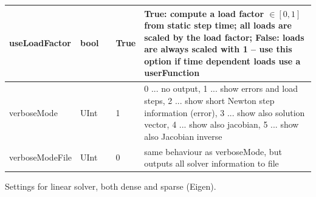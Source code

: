 \begin{center}
\begin{longtable}{| p{4.2cm} | p{2.5cm} | p{0.3cm} | p{3.0cm} | p{6cm} |}
    useLoadFactor &     bool &      &     True &     True: compute a load factor $\in [0,1]$ from static step time; all loads are scaled by the load factor; False: loads are always scaled with 1 -- use this option if time dependent loads use a userFunction\\ \hline
    verboseMode &     UInt &      &     1 &     0 ... no output, 1 ... show errors and load steps, 2 ... show short Newton step information (error), 3 ... show also solution vector, 4 ... show also jacobian, 5 ... show also Jacobian inverse\\ \hline
    verboseModeFile &     UInt &      &     0 &     same behaviour as verboseMode, but outputs all solver information to file\\ \hline
	  \end{longtable}
	\end{center}



\label{sec:LinearSolverSettings}
Settings for linear solver, both dense and sparse (Eigen).

